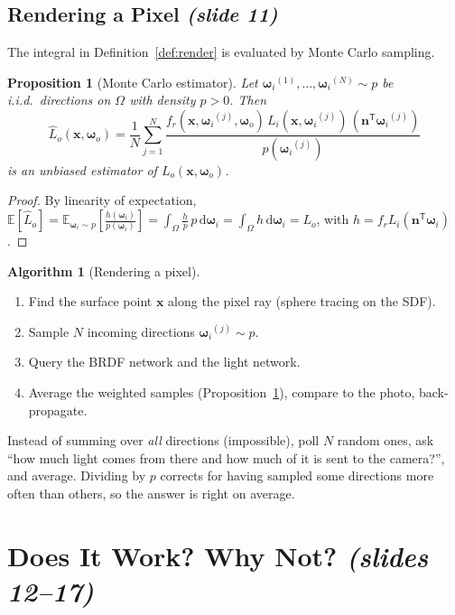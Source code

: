 \documentclass[11pt,a4paper]{article}
\theoremstyle{definition}
\newtheorem{algorithm}[definition]{Algorithm}
\theoremstyle{plain}
\newtheorem{proposition}[definition]{Proposition}
\theoremstyle{remark}
\newcommand{\slides}[2]{\texorpdfstring{\emph{(slides #1--#2)}}{(slides #1-#2)}}
\newcommand{\slideone}[1]{\texorpdfstring{\emph{(slide #1)}}{(slide #1)}}
\newcommand{\x}{{\bm{x}}}
\newcommand{\n}{{\bm{n}}}
\newcommand{\wi}{{\bm{\omega}_i}}
\newcommand{\wo}{{\bm{\omega}_o}}
\newcommand{\fr}{f_r}
\newcommand{\Lo}{L_o}
\newcommand{\Li}{L_i}
\begin{document}
\subsection{Rendering a Pixel \slideone{11}}

The integral in Definition~\ref{def:render} is evaluated by Monte Carlo sampling.

\begin{proposition}[Monte Carlo estimator]\label{prop:mc}
Let $\wi^{(1)},\dots,\wi^{(N)}\sim p$ be i.i.d.\ directions on $\Omega$ with density $p>0$. Then
\[
 \widehat L_o(\x,\wo)=\frac1N\sum_{j=1}^N\frac{\fr(\x,\wi^{(j)},\wo)\,\Li(\x,\wi^{(j)})\,(\n^{\mathsf T}\wi^{(j)})}{p(\wi^{(j)})}
\]
is an unbiased estimator of $\Lo(\x,\wo)$.
\end{proposition}
\begin{proof}
By linearity of expectation, $\mathbb E[\widehat L_o]=\mathbb E_{\wi\sim p}\!\left[\tfrac{h(\wi)}{p(\wi)}\right]=\int_\Omega \tfrac{h}{p}\,p\,\mathrm d\wi=\int_\Omega h\,\mathrm d\wi=\Lo$, with $h=\fr\Li(\n^{\mathsf T}\wi)$.
\end{proof}

\begin{algorithm}[Rendering a pixel]
\begin{enumerate}[nosep]
 \item Find the surface point $\x$ along the pixel ray (sphere tracing on the SDF).
 \item Sample $N$ incoming directions $\wi^{(j)}\sim p$.
 \item Query the BRDF network and the light network.
 \item Average the weighted samples (Proposition~\ref{prop:mc}), compare to the photo, back-propagate.
\end{enumerate}
\end{algorithm}

\begin{intuition}
Instead of summing over \emph{all} directions (impossible), poll $N$ random ones, ask ``how much light comes from there and how much of it is sent to the camera?'', and average. Dividing by $p$ corrects for having sampled some directions more often than others, so the answer is right on average.
\end{intuition}

\section{Does It Work? Why Not? \slides{12}{17}}
\end{document}
